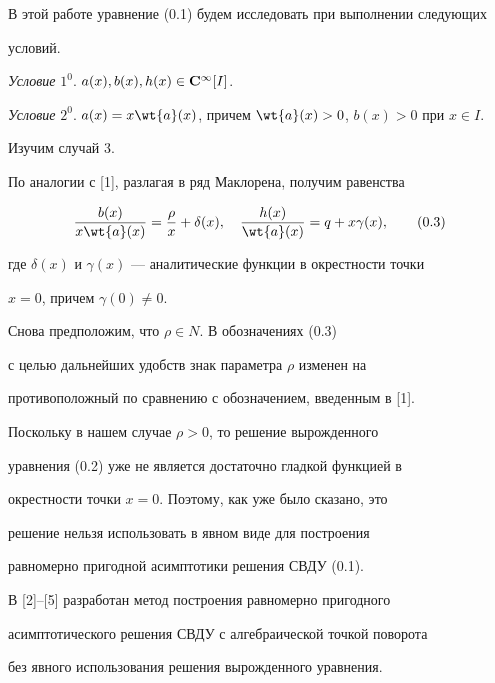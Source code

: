 В этой работе уравнение (0.1) будем исследовать при выполнении следующих


условий.





{\it Условие} $1^0$. $a(x), b(x), h(x) \in \bold{C}^{\infty} [I]$.





{\it Условие} $2^0$. $a(x) = x \wt{a} (x)$, причем $\wt{a}


(x) >0$, $b(x) >0$ при $x \in I$.





Изучим случай 3.


По аналогии с [1], разлагая в ряд Маклорена, получим равенства


\begin{equation}


\frac{b(x)}{x \wt{a} (x)} = \frac{\rho}{x} + \delta (x),


\quad \frac{h(x)}{\wt{a} (x)} = q + x \g (x),\tag{0.3}


\end{equation}


где $\delta (x)$ и $\gamma (x)$ --- аналитические функции в окрестности точки


$x = 0$, причем $\gamma (0) \neq 0$.


Снова предположим, что $\rho \in N$. В обозначениях (0.3)


с целью дальнейших удобств знак параметра $\rho$ изменен на


противоположный по сравнению с обозначением, введенным в [1].


Поскольку в нашем случае $\rho > 0$, то решение вырожденного


уравнения (0.2) уже не является достаточно гладкой функцией в


окрестности точки $x = 0$. Поэтому, как уже было сказано, это


решение нельзя использовать в явном виде для построения


равномерно пригодной асимптотики решения СВДУ (0.1).





В [2]--[5] разработан метод построения равномерно пригодного


асимптотического решения СВДУ с алгебраической точкой поворота


без явного использования решения вырожденного уравнения.





